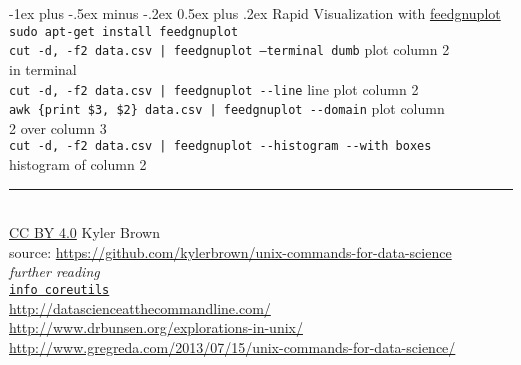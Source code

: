 \documentclass[10pt]{article}
\makeatletter
\renewcommand{\section}{\@startsection{section}{1}{0mm}%
                                {-1ex plus -.5ex minus -.2ex}%
                                {0.5ex plus .2ex}%
                                {\normalfont\large\bfseries}}
\newcommand{\q}{\textquotesingle } %
\makeatother
\begin{document}
\begin{multicols}{2}
\section{Rapid Visualization with \href{https://github.com/dkogan/feedgnuplot}{feedgnuplot}}
{\tt sudo apt-get install feedgnuplot}\\
{\tt cut -d, -f2  data.csv | feedgnuplot --terminal \q dumb\q} \hfill plot column 2\\
	\hfill in terminal\\
{\tt  cut -d, -f2  data.csv | feedgnuplot -{}-line} \hfill line plot column 2\\
{\tt awk \q\{print \$3, \$2\}\q\  data.csv | feedgnuplot -{}-domain} \hfill plot column\\
	\hfill 2 over column 3\\
{\tt cut -d, -f2   data.csv | feedgnuplot -{}-histogram -{}-with boxes}\\
	\hfill histogram of column 2\\

\rule{0.3\linewidth}{0.25pt}\\
\scriptsize
\href{https://creativecommons.org/licenses/by/4.0/}{CC BY 4.0} Kyler Brown\\
source: \url{https://github.com/kylerbrown/unix-commands-for-data-science}\\

\textit{further reading}\\
\href{https://www.gnu.org/software/coreutils/manual/coreutils.html}{{\tt info coreutils}}\\
\url{http://datascienceatthecommandline.com/}\\
\url{http://www.drbunsen.org/explorations-in-unix/}\\
\url{http://www.gregreda.com/2013/07/15/unix-commands-for-data-science/}\\


\end{multicols}
\end{document}
